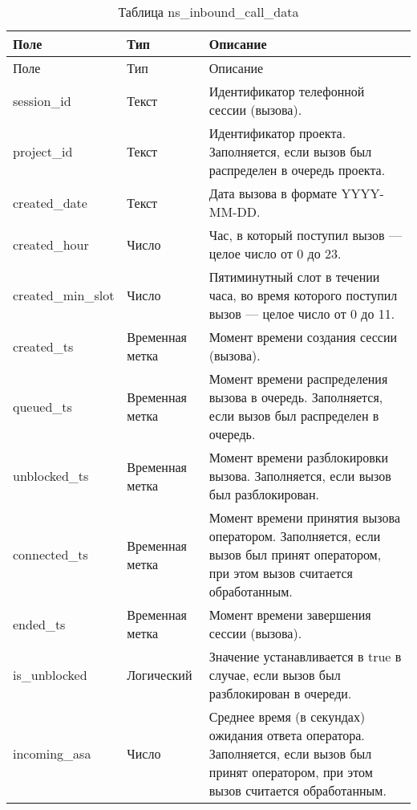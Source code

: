 \begin{small}
    \begin{longtable}{|p{}|p{}|p{}|}
        \caption{Таблица ns\_inbound\_call\_data}
        \label{tab:db:ns-inbound-call-data}
        \\ \hline
        Поле & Тип & Описание \\
        \hline \endfirsthead
        \hline
        Поле & Тип & Описание \\
        \hline
        \endhead
        \hline \endlastfoot
        session\_id &
        Текст &
        Идентификатор телефонной сессии (вызова). \\
 \hline
        project\_id &
        Текст &
        Идентификатор проекта. Заполняется, если вызов был распределен в очередь проекта. \\
 \hline
        created\_date &
        Текст &
        Дата вызова в формате YYYY-MM-DD. \\
 \hline
        created\_hour &
        Число &
        Час, в который поступил вызов — целое число от 0 до 23. \\
 \hline
        created\_min\_slot &
        Число &
        Пятиминутный слот в течении часа, во время которого поступил вызов — целое число от 0 до 11. \\
 \hline
        created\_ts &
        Временная метка &
        Момент времени создания сессии (вызова). \\
 \hline
        queued\_ts &
        Временная метка &
        Момент времени распределения вызова в очередь. Заполняется, если вызов был распределен в очередь. \\
 \hline
        unblocked\_ts &
        Временная метка &
        Момент времени разблокировки вызова. Заполняется, если вызов был разблокирован. \\
 \hline
        connected\_ts &
        Временная метка &
        Момент времени принятия вызова оператором. Заполняется, если вызов был принят оператором, при этом вызов считается обработанным. \\
 \hline
        ended\_ts &
        Временная метка &
        Момент времени завершения сессии (вызова). \\
 \hline
        is\_unblocked &
        Логический &
        Значение устанавливается в true в случае, если вызов был разблокирован в очереди. \\
 \hline
        incoming\_asa &
        Число &
        Среднее время (в секундах) ожидания ответа оператора. Заполняется, если вызов был принят оператором, при этом вызов считается обработанным. \\

\end{longtable}
\end{small}
